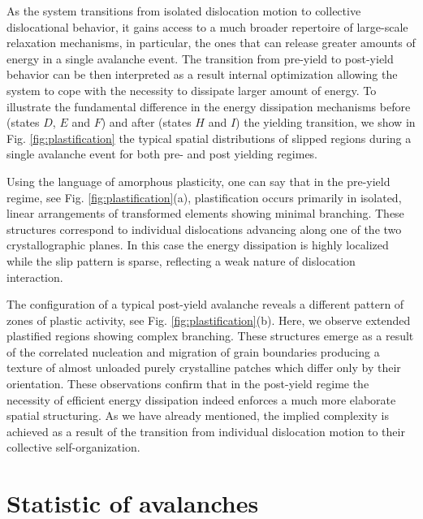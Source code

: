 \documentclass[aps,
superscriptaddress,notitlepage]{revtex4-1}
\begin{document}
 As the system transitions from isolated dislocation motion to collective dislocational behavior, it  gains access to a much broader repertoire of large-scale relaxation mechanisms, in particular, the ones that can release greater amounts of energy in a single avalanche event.  The transition from pre-yield to post-yield behavior can be then interpreted as a result  internal optimization allowing the system to cope with the necessity to dissipate larger amount of energy.  To illustrate the fundamental difference in the energy dissipation mechanisms  before (states $D$, $E$ and $F$) and after (states $H$ and $I$) the yielding transition,  we show in  Fig. \ref{fig:plastification} the typical spatial distributions of slipped regions during a single avalanche event for  both pre- and post yielding regimes. 

Using the language of amorphous plasticity, one  can say that  in the   pre-yield regime, see Fig. \ref{fig:plastification}(a), plastification occurs primarily in isolated, linear arrangements of transformed elements  showing minimal branching. These structures correspond to individual dislocations advancing  along one of the two  crystallographic planes. In this case   the energy dissipation is highly localized  while the   slip pattern is   sparse, reflecting a weak nature of dislocation interaction.  

The configuration of a typical post-yield avalanche  reveals a   different pattern of zones of plastic activity, see  Fig. \ref{fig:plastification}(b). Here, we observe   extended plastified regions showing complex branching. These structures emerge as a result of  the correlated nucleation and migration of grain boundaries producing a   texture of  almost unloaded   purely   crystalline patches which differ only by their orientation.  These observations confirm  that  in the post-yield regime the necessity  of efficient energy dissipation  indeed enforces  a  much more elaborate  spatial  structuring.
 As we have already mentioned, the implied  complexity is achieved as a result of  the transition from individual dislocation motion to their collective self-organization. 


\section{Statistic of avalanches}
\end{document}
